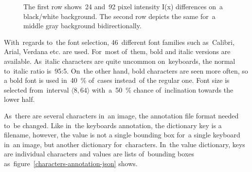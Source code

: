 \begin{figure}[tbh]
    \caption{The first row shows~24 and~92 pixel intensity I(x) differences on~a black/white background. The second row depicts the same for~a middle gray background bidirectionally.}
    \label{font-color-selection}
\end{figure}

With~regards to~the font selection, 46~different font families such as~Calibri, Arial, Verdana etc. are used. For~most of~them, bold and italic versions are available. As~italic characters are quite uncommon on~keyboards, the normal to~italic ratio is~95:5. On~the other hand, bold characters are seen more often, so a bold font is used in~40~\% of~cases instead~of the regular one. Font size is selected from~interval \(\langle8, 64\rangle\) with~a~50~\% chance of~inclination towards the lower half.

As~there are several characters in~an image, the annotation file format needed to~be changed. Like in~the keyboards annotation, the dictionary key is a filename, however, the value is not a single bounding box for~a single keyboard in~an image, but another dictionary for~characters. In~the value dictionary, keys are individual characters and values are lists of~bounding boxes as~figure~\ref{characters-annotation-json} shows.

